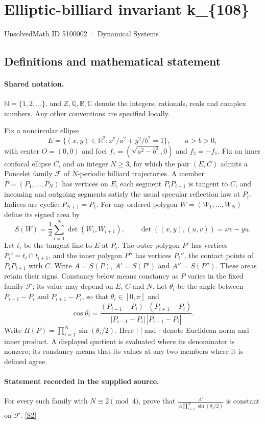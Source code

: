 \documentclass[11pt]{article}
\newcommand{\sref}[2]{\hyperlink{source:#1:#2}{[S#2]}}
\begin{document}
\setcounter{section}{5100001}
\section{Elliptic-billiard invariant k\_\{108\}}\label{5100002}
{\small\sffamily UnsolvedMath ID 5100002 · Dynamical Systems}
\subsection{Definitions and mathematical statement}

\paragraph{Shared notation.}$\mathbb N=\{1,2,\ldots\}$, and $\mathbb Z,\mathbb Q,\mathbb R,\mathbb C$ denote the integers, rationals, reals and complex numbers. Any other conventions are specified locally.


Fix a noncircular ellipse
\[
E=\{(x,y)\in\mathbb R^2:x^2/a^2+y^2/b^2=1\},\qquad a>b>0,
\]
with center $O=(0,0)$ and foci $f_1=(\sqrt{a^2-b^2},0)$ and $f_2=-f_1$. Fix an inner confocal ellipse $C$, and an integer $N\geq3$, for which the pair $(E,C)$ admits a Poncelet family $\mathcal F$ of $N$-periodic billiard trajectories. A member $P=(P_1,\ldots,P_N)$ has vertices on $E$, each segment $P_iP_{i+1}$ is tangent to $C$, and incoming and outgoing segments satisfy the usual specular reflection law at $P_i$. Indices are cyclic: $P_{N+1}=P_1$.
For any ordered polygon $W=(W_1,\ldots,W_N)$ define its signed area by
\[
S(W)=\frac12\sum_{i=1}^N\det(W_i,W_{i+1}),\qquad
\det((x,y),(u,v))=xv-yu.
\]
Let $t_i$ be the tangent line to $E$ at $P_i$. The outer polygon $P'$ has vertices $P_i'=t_i\cap t_{i+1}$, and the inner polygon $P''$ has vertices $P_i''$, the contact points of $P_iP_{i+1}$ with $C$. Write $A=S(P)$, $A'=S(P')$ and $A''=S(P'')$. These areas retain their signs. Constancy below means constancy as $P$ varies in the fixed family $\mathcal F$; its value may depend on $E$, $C$ and $N$.
Let $\theta_i$ be the angle between $P_{i-1}-P_i$ and $P_{i+1}-P_i$, so that $\theta_i\in[0,\pi]$ and
\[
\cos\theta_i=\frac{(P_{i-1}-P_i)\cdot(P_{i+1}-P_i)}{|P_{i-1}-P_i|\,|P_{i+1}-P_i|}.
\]
Write $H(P)=\prod_{i=1}^N\sin(\theta_i/2)$. Here $|\cdot|$ and $\cdot$ denote Euclidean norm and inner product.
A displayed quotient is evaluated where its denominator is nonzero; its constancy means that its values at any two members where it is defined agree.
\paragraph{Statement recorded in the supplied source.}
For every such family with $N\equiv2\pmod4$, prove that $\displaystyle \frac{A'}{A\prod_{i=1}^N\sin(\theta_i/2)}$ is constant on $\mathcal F$. \sref{5100002}{2}
\end{document}
